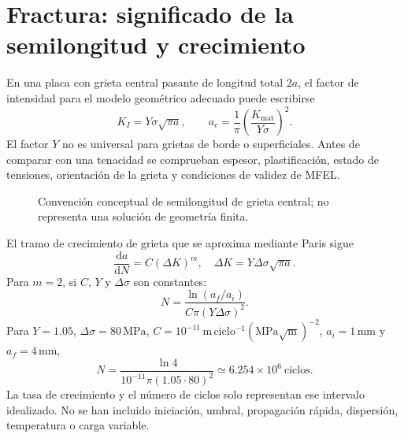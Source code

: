 \section{Fractura: significado de la semilongitud y crecimiento}
En una placa con grieta central pasante de longitud total $2a$, el factor de intensidad para el modelo geométrico adecuado puede escribirse
\begin{equation}
K_I=Y\sigma\sqrt{\pi a},\qquad
a_c=\frac{1}{\pi}\left(\frac{K_{\mathrm{mat}}}{Y\sigma}\right)^2.
\label{eq:av-matmo-k}
\end{equation}
El factor $Y$ no es universal para grietas de borde o superficiales. Antes de comparar con una tenacidad se comprueban espesor, plastificación, estado de tensiones, orientación de la grieta y condiciones de validez de MFEL.

\begin{figure}[htbp]\centering
{}
\caption{Convención conceptual de semilongitud de grieta central; no representa una solución de geometría finita.}
\label{fig:av-matmo-grieta}
\end{figure}

El tramo de crecimiento de grieta que se aproxima mediante Paris sigue
\begin{equation}
\frac{\mathrm da}{\mathrm dN}=C(\Delta K)^m,\quad
\Delta K=Y\Delta\sigma\sqrt{\pi a}.
\end{equation}
Para $m=2$, si $C$, $Y$ y $\Delta\sigma$ son constantes:
\begin{equation}
N=\frac{\ln(a_f/a_i)}{C\pi(Y\Delta\sigma)^2}.
\label{eq:av-matmo-paris2}
\end{equation}
{Para $Y=1.05$, $\Delta\sigma=80\,\mathrm{MPa}$, $C=10^{-11}\,\mathrm{m\,ciclo^{-1}}(\mathrm{MPa}\sqrt{\mathrm m})^{-2}$, $a_i=1\,\mathrm{mm}$ y $a_f=4\,\mathrm{mm}$,
\[
N=\frac{\ln4}{10^{-11}\pi(1.05\cdot80)^2}\simeq6.254\times10^6\ \mathrm{ciclos}.
\]
La tasa de crecimiento y el número de ciclos solo representan ese intervalo idealizado. No se han incluido iniciación, umbral, propagación rápida, dispersión, temperatura o carga variable.}
